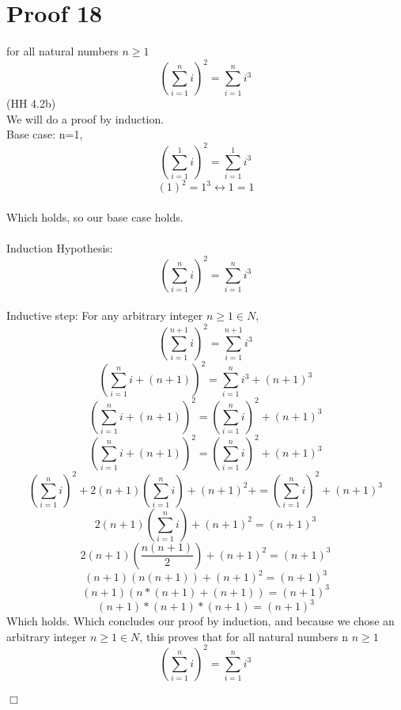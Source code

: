 \documentclass{article}
\begin{document}
\section{Proof 18}
for all natural numbers $n\geq1$ $$(\sum^{n}_{i=1}i)^2 = \sum^{n}_{i=1}i^3$$ (HH 4.2b)\\
We will do a proof by induction.\\
Base case: n=1, $$(\sum^{1}_{i=1}i)^2 = \sum^{1}_{i=1}i^3$$
$$(1)^2 = 1^3 \leftrightarrow 1=1$$\\
Which holds, so our base case holds.\\
\\
Induction Hypothesis: $$(\sum^{n}_{i=1}i)^2 = \sum^{n}_{i=1}i^3$$\\
Inductive step: 
For any arbitrary integer $n \geq 1 \in N$, $$(\sum^{n+1}_{i=1}i)^2 = \sum^{n+1}_{i=1}i^3$$
$$(\sum^{n}_{i=1}i + (n+1))^2 = \sum^{n}_{i=1}i^3 + (n+1)^3$$
$$(\sum^{n}_{i=1}i + (n+1))^2 = (\sum^{n}_{i=1}i)^2 + (n+1)^3$$
$$(\sum^{n}_{i=1}i + (n + 1))^2 = (\sum^{n}_{i=1}i)^2 + (n+1)^3$$
$$(\sum^{n}_{i=1}i)^2 + 2(n + 1)(\sum^{n}_{i=1}i)+ (n + 1)^2 +  = (\sum^{n}_{i=1}i)^2 + (n+1)^3$$
$$ 2(n + 1)(\sum^{n}_{i=1}i)+ (n + 1)^2  = (n+1)^3$$
$$ 2(n + 1)(\frac{n(n+1)}{2})+ (n + 1)^2  = (n+1)^3$$
$$ (n + 1)(n(n+1))+ (n + 1)^2  = (n+1)^3$$
$$ (n+1)( n*(n+1) + (n+1) ) = (n+1)^3$$
$$ (n+1)*(n+1)*(n+1)  = (n+1)^3$$
Which holds. 
Which concludes our proof by induction, and because we chose an arbitrary integer $n \geq 1 \in N$, this proves that for all natural numbers n $n\geq1$ $$(\sum^{n}_{i=1}i)^2 = \sum^{n}_{i=1}i^3$$\\
$\Box$
\end{document}
